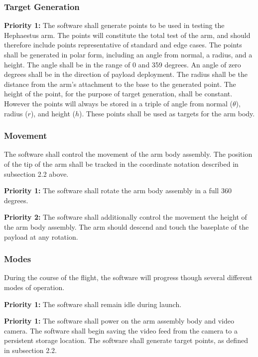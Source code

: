 \subsubsection{Target Generation}
\textbf{Priority 1:}
The software shall generate points to be used in testing the Hephaestus arm.
The points will constitute the total test of the arm, and should therefore include points
representative of standard and edge cases.
The points shall be generated in polar form, including an angle from normal, a radius, and a height. 
The angle shall be in the range of 0 and 359 degrees.
An angle of zero degrees shall be in the direction of payload deployment.
The radius shall be the distance from the arm's attachment to the base to the generated point.
The height of the point, for the purpose of target generation, shall be constant.
However the points will always be stored in a triple of angle from normal (\(\theta\)), radius (\(r\)), and height (\(h\)).
These points shall be used as targets for the arm body.

\subsubsection{Movement}
The software shall control the movement of the arm body assembly. 
The position of the tip of the arm shall be tracked in the coordinate notation described in subsection 2.2 above.

\textbf{Priority 1:}
The software shall rotate the arm body assembly in a full 360 degrees.

\textbf{Priority 2:}
The software shall additionally control the movement the height of the arm body assembly.
The arm should descend and touch the baseplate of the payload at any rotation.

\subsubsection{Modes}
During the course of the flight, the software will progress though several different modes of operation.

\textbf{Priority 1:}
The software shall remain idle during launch.

\textbf{Priority 1:}
The software shall power on the arm assembly body and video camera.
The software shall begin saving the video feed from the camera to a persistent storage location.
The software shall generate target points, as defined in subsection 2.2.

